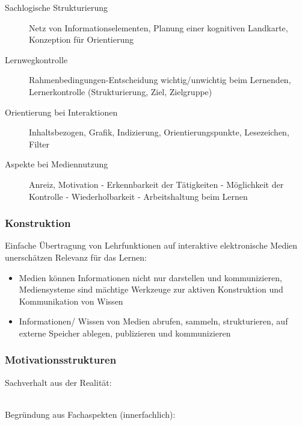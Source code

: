 \documentclass[a4paper]{article}
\begin{document}
\begin{description}
	\item[Sachlogische Strukturierung] Netz von Informationselementen, Planung einer kognitiven Landkarte, Konzeption für Orientierung
	\item[Lernwegkontrolle] Rahmenbedingungen-Entscheidung wichtig/unwichtig beim Lernenden, Lernerkontrolle (Strukturierung, Ziel, Zielgruppe)
	\item[Orientierung bei Interaktionen] Inhaltsbezogen, Grafik, Indizierung, Orientierungspunkte, Lesezeichen, Filter
	\item[Aspekte bei Mediennutzung] Anreiz, Motivation  - Erkennbarkeit der Tätigkeiten - Möglichkeit der Kontrolle - Wiederholbarkeit - Arbeitshaltung beim Lernen
\end{description}

\subsubsection{Konstruktion}

Einfache Übertragung von Lehrfunktionen auf interaktive elektronische Medien unerschätzen Relevanz für das Lernen:

\begin{itemize}
	\item Medien können Informationen nicht nur darstellen und kommunizieren, Mediensysteme sind mächtige Werkzeuge zur aktiven Konstruktion und Kommunikation von Wissen
	\item Informationen/ Wissen von Medien abrufen, sammeln, strukturieren, auf externe Speicher ablegen, publizieren und kommunizieren
\end{itemize}

\subsubsection{Motivationsstrukturen}

Sachverhalt aus der Realität:\\

~\\
Begründung aus Fachaspekten (innerfachlich):\\
\end{document}
